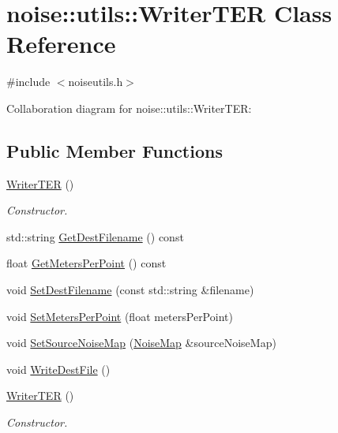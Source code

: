 \hypertarget{classnoise_1_1utils_1_1_writer_t_e_r}{\section{noise\+:\+:utils\+:\+:Writer\+T\+E\+R Class Reference}
\label{classnoise_1_1utils_1_1_writer_t_e_r}
}


{\ttfamily \#include $<$noiseutils.\+h$>$}



Collaboration diagram for noise\+:\+:utils\+:\+:Writer\+T\+E\+R\+:
\subsection*{Public Member Functions}
\begin{DoxyCompactItemize}
\item 
\hyperlink{classnoise_1_1utils_1_1_writer_t_e_r_a6504f93a224b3c91ff67ffee09824fe2}{Writer\+T\+E\+R} ()
\begin{DoxyCompactList}\small\item\em Constructor. \end{DoxyCompactList}\item 
std\+::string \hyperlink{classnoise_1_1utils_1_1_writer_t_e_r_a6cbb6d1ef375ab37fa275a8035c5f28e}{Get\+Dest\+Filename} () const 
\item 
float \hyperlink{classnoise_1_1utils_1_1_writer_t_e_r_a320c265c66960fad0a421f0deced0860}{Get\+Meters\+Per\+Point} () const 
\item 
void \hyperlink{classnoise_1_1utils_1_1_writer_t_e_r_af8db9e0a480658949ba8d37f4cb03368}{Set\+Dest\+Filename} (const std\+::string \&filename)
\item 
void \hyperlink{classnoise_1_1utils_1_1_writer_t_e_r_a77f53ea49305858a04ee3cac14d119ec}{Set\+Meters\+Per\+Point} (float meters\+Per\+Point)
\item 
void \hyperlink{classnoise_1_1utils_1_1_writer_t_e_r_a26314e0c188948fa01200a54189c28ca}{Set\+Source\+Noise\+Map} (\hyperlink{classnoise_1_1utils_1_1_noise_map}{Noise\+Map} \&source\+Noise\+Map)
\item 
void \hyperlink{classnoise_1_1utils_1_1_writer_t_e_r_ad4332c36a48cb32bef6798def109052e}{Write\+Dest\+File} ()
\item 
\hyperlink{classnoise_1_1utils_1_1_writer_t_e_r_a6504f93a224b3c91ff67ffee09824fe2}{Writer\+T\+E\+R} ()
\begin{DoxyCompactList}\small\item\em Constructor. \end{DoxyCompactList}\item 

\end{DoxyCompactItemize}
